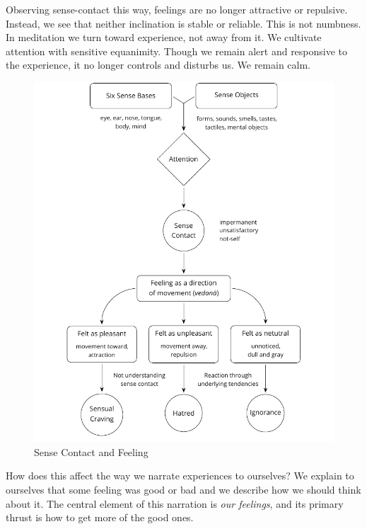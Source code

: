Observing sense-contact this way, feelings are no longer attractive or
repulsive. Instead, we see that neither inclination is stable or
reliable. This is not numbness. In meditation we turn toward experience,
not away from it. We cultivate attention with sensitive equanimity.
Though we remain alert and responsive to the experience, it no longer
controls and disturbs us. We remain calm.

\clearpage
\figurepagelayout

\begin{figure}[h]
\caption{Sense Contact and Feeling}\label{fig-sense-contact-feeling}
\bigskip
\includegraphics[width=\linewidth]{./manuscript/tex/diagrams/sense-contact-feeling.pdf}
\end{figure}

\clearpage
\normalpagelayout

\vspace*{-\baselineskip}


How does this affect the way we narrate experiences to ourselves? We
explain to ourselves that some feeling was good or bad and we describe
how we should think about it. The central element of this narration is
\emph{our feelings}, and its primary thrust is how to get more of the
good ones.

